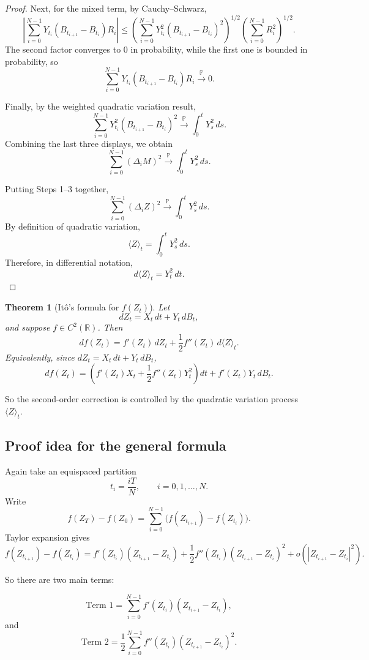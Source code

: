 \documentclass[11pt]{article}
\newtheorem{theorem}{Theorem}[section]
\theoremstyle{definition}
\begin{document}
\begin{proof}
Next, for the mixed term, by Cauchy--Schwarz,
\[
\left|\sum_{i=0}^{N-1}Y_{t_i}(B_{t_{i+1}}-B_{t_i})R_i\right|
\le
\left(\sum_{i=0}^{N-1}Y_{t_i}^2(B_{t_{i+1}}-B_{t_i})^2\right)^{1/2}
\left(\sum_{i=0}^{N-1}R_i^2\right)^{1/2}.
\]
The second factor converges to \(0\) in probability, while the first one is bounded in probability, so
\[
\sum_{i=0}^{N-1}Y_{t_i}(B_{t_{i+1}}-B_{t_i})R_i
\xrightarrow{\mathbb P} 0.
\]

Finally, by the weighted quadratic variation result,
\[
\sum_{i=0}^{N-1}Y_{t_i}^2(B_{t_{i+1}}-B_{t_i})^2
\xrightarrow{\mathbb P}
\int_0^t Y_s^2\,ds.
\]
Combining the last three displays, we obtain
\[
\sum_{i=0}^{N-1}(\Delta_i M)^2
\xrightarrow{\mathbb P}
\int_0^t Y_s^2\,ds.
\]

\medskip
\noindent
Putting Steps 1--3 together,
\[
\sum_{i=0}^{N-1}(\Delta_i Z)^2
\xrightarrow{\mathbb P}
\int_0^t Y_s^2\,ds.
\]
By definition of quadratic variation,
\[
\langle Z\rangle_t=\int_0^t Y_s^2\,ds.
\]
Therefore, in differential notation,
\[
d\langle Z\rangle_t=Y_t^2\,dt.
\]
\end{proof}

\begin{theorem}[It\^o's formula for \(f(Z_t)\)]
Let
\[
dZ_t=X_t\,dt+Y_t\,dB_t,
\]
and suppose \(f\in C^2(\mathbb R)\). Then
\[
df(Z_t)
=
f'(Z_t)\,dZ_t+\frac12 f''(Z_t)\,d\langle Z\rangle_t.
\]
Equivalently, since \(dZ_t=X_t\,dt+Y_t\,dB_t\),
\[
df(Z_t)
=
\left(f'(Z_t)X_t+\frac12 f''(Z_t)Y_t^2\right)dt
+
f'(Z_t)Y_t\,dB_t.
\]
\end{theorem}

So the second-order correction is controlled by the quadratic variation process \(\langle Z\rangle_t\).

\subsection{Proof idea for the general formula}

Again take an equispaced partition
\[
t_i=\frac{iT}{N},\qquad i=0,1,\dots,N.
\]
Write
\[
f(Z_T)-f(Z_0)
=
\sum_{i=0}^{N-1}\bigl(f(Z_{t_{i+1}})-f(Z_{t_i})\bigr).
\]
Taylor expansion gives
\[
f(Z_{t_{i+1}})-f(Z_{t_i})
=
f'(Z_{t_i})(Z_{t_{i+1}}-Z_{t_i})
+
\frac12 f''(Z_{t_i})(Z_{t_{i+1}}-Z_{t_i})^2
+
o\!\left(|Z_{t_{i+1}}-Z_{t_i}|^2\right).
\]

So there are two main terms:

\[
\text{Term 1}=
\sum_{i=0}^{N-1} f'(Z_{t_i})(Z_{t_{i+1}}-Z_{t_i}),
\]
and
\[
\text{Term 2}=
\frac12\sum_{i=0}^{N-1} f''(Z_{t_i})(Z_{t_{i+1}}-Z_{t_i})^2.
\]
\end{document}

